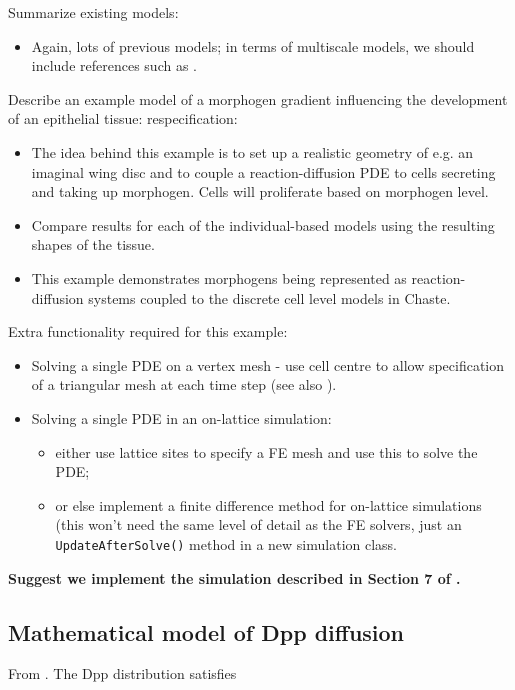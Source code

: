 \documentclass[12pt]{article}
\newcommand{\highlight}[1]{{\color{red} \bf{#1}}}
\begin{document}
\noindent Summarize existing models:
\begin{itemize}
\item Again, lots of previous models; in terms of multiscale models, we should include references such as \citet{Schilling2011Cell}.
\end{itemize}

\noindent Describe an example model of a morphogen gradient influencing the development of an epithelial tissue: respecification:
\begin{itemize}
\item The idea behind this example is to set up a realistic geometry of e.g. an imaginal wing disc and to couple a reaction-diffusion PDE to cells secreting and taking up morphogen. Cells will proliferate based on morphogen level.
\item Compare results for each of the individual-based models using the resulting shapes of the tissue.
\item This example demonstrates morphogens being represented as reaction-diffusion systems coupled to the discrete cell level models in Chaste.
\end{itemize}



\noindent Extra functionality required for this example:
\begin{itemize}
\item Solving a single PDE on a vertex mesh - use cell centre to allow specification of a triangular mesh at each time step (see also \citet{Smith2011Incorporating}).
\item Solving a single PDE in an on-lattice simulation:
\begin{itemize}
\item either use lattice sites to specify a FE mesh and use this to solve the PDE;
\item or else implement a finite difference method for on-lattice simulations (this won't need the same level of detail as the FE solvers, just an \texttt{UpdateAfterSolve()} method in a new simulation class.
\end{itemize}
\end{itemize}

\highlight{Suggest we implement the simulation described in Section 7 of \citet{Smith2011Incorporating}.}


\subsection{Mathematical model of Dpp diffusion}
From \citet{Smith2011Incorporating}. The Dpp distribution satisfies
\end{document}
